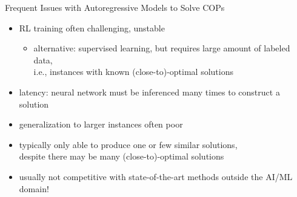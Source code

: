 \documentclass[aspectratio=1610]{beamer}
\newcommand{\important}[1]{{\color{green!60!black}#1}}
\begin{document}
\begin{frame}{Frequent Issues with Autoregressive Models to Solve COPs}
	\begin{itemize}
		\itemsep2.5ex
		\item RL \alert{training often challenging}, unstable
		\begin{itemize}
			\item alternative: \important{supervised learning}, but requires large amount of labeled data,\\ 
			i.e., instances with known (close-to)-optimal solutions
		\end{itemize}
		\item \alert{latency}: neural network must be inferenced many times to construct a solution
		\item \alert{generalization} to larger instances often poor
		\item typically only able to \alert{produce one or few similar solutions},\\ despite there may be many (close-to)-optimal solutions
		\item usually \alert{not competitive with state-of-the-art methods} outside the AI/ML domain!
	\end{itemize}
\end{frame}




\end{document}
